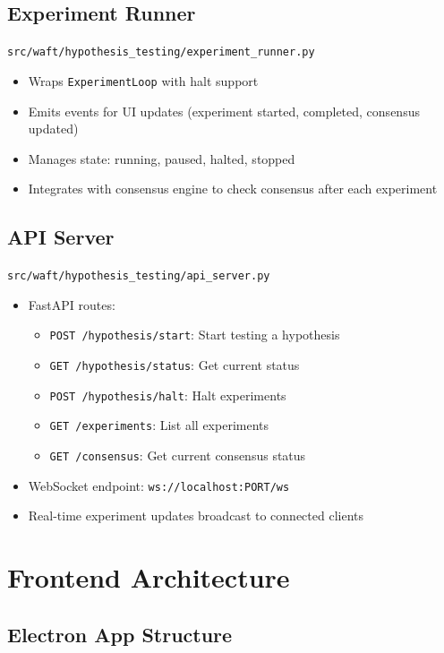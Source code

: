 \documentclass{book}
\begin{document}
\subsection{Experiment Runner}

\texttt{src/waft/hypothesis\_testing/experiment\_runner.py}

\begin{itemize}
    \item Wraps \texttt{ExperimentLoop} with halt support
    \item Emits events for UI updates (experiment started, completed, consensus updated)
    \item Manages state: running, paused, halted, stopped
    \item Integrates with consensus engine to check consensus after each experiment
\end{itemize}

\subsection{API Server}

\texttt{src/waft/hypothesis\_testing/api\_server.py}

\begin{itemize}
    \item FastAPI routes:
    \begin{itemize}
        \item \texttt{POST /hypothesis/start}: Start testing a hypothesis
        \item \texttt{GET /hypothesis/status}: Get current status
        \item \texttt{POST /hypothesis/halt}: Halt experiments
        \item \texttt{GET /experiments}: List all experiments
        \item \texttt{GET /consensus}: Get current consensus status
    \end{itemize}
    \item WebSocket endpoint: \texttt{ws://localhost:PORT/ws}
    \item Real-time experiment updates broadcast to connected clients
\end{itemize}

\section{Frontend Architecture}

\subsection{Electron App Structure}
\end{document}
